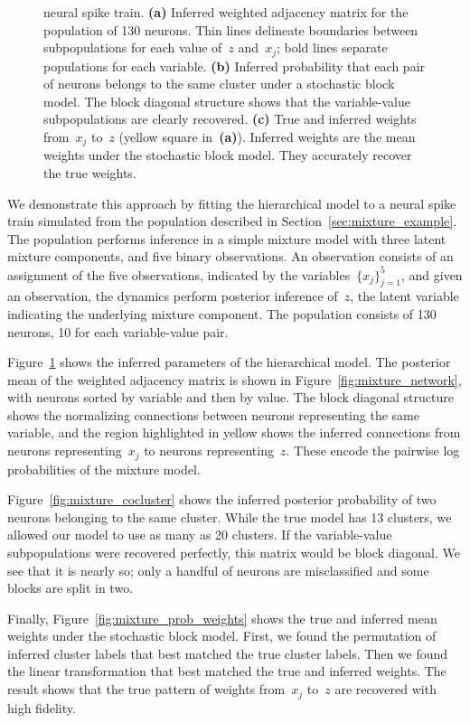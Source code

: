 \begin{figure}[t!]
{   neural spike train.
   \textbf{(a)} Inferred weighted adjacency matrix for the population
   of 130 neurons. Thin lines delineate boundaries between subpopulations
   for each value of~$z$ and~$x_j$; bold lines separate populations for
   each variable. 
   \textbf{(b)} Inferred probability that each pair of neurons belongs to
   the same cluster under a stochastic block model.
   The block diagonal structure shows that the
   variable-value subpopulations are clearly recovered.
   \textbf{(c)} True and inferred weights
   from~$x_j$ to~$z$ (yellow square in~\textbf{(a)}). Inferred weights
   are the mean weights under the stochastic block model. They accurately
   recover the true weights.
 }
 \label{fig:mixture_recovery}
\end{figure}

We demonstrate this approach by 
fitting the hierarchical model to a neural spike train simulated
from the population described in
Section~\ref{sec:mixture_example}. The population performs inference
in a simple mixture model with three latent mixture components,
and five binary observations. An observation consists of an assignment
of the five observations, indicated
by the variables~$\{x_j\}_{j=1}^5$, and given an observation, the dynamics
perform posterior inference of~$z$, the latent variable indicating the
underlying mixture component. The population consists of 130 neurons, 10 for
each variable-value pair.



Figure~\ref{fig:mixture_recovery} shows the inferred parameters of the
hierarchical model. The posterior mean of the weighted adjacency
matrix is shown in Figure~\ref{fig:mixture_network}, with neurons sorted
by variable and then by value. The block diagonal structure shows
the normalizing connections between neurons representing the same variable,
and the region highlighted in yellow shows the inferred connections from
neurons representing~$x_j$ to neurons representing~$z$. These encode
the pairwise log probabilities of the mixture model.

Figure~\ref{fig:mixture_cocluster} shows the inferred posterior probability
of two neurons belonging to the same cluster. While the true model has
13 clusters, we allowed our model to use as many as 20 clusters.
If the variable-value subpopulations
were recovered perfectly, this matrix would be block diagonal. We
see that it is nearly so; only a handful of neurons are misclassified
and some blocks are split in two.

Finally, Figure~\ref{fig:mixture_prob_weights} shows the true and inferred
mean weights under the stochastic block model. First, we found the permutation
of inferred cluster labels that best matched the true cluster labels. Then we found the
linear transformation that best matched the true and inferred weights.
The result shows that the true pattern of weights from~$x_j$ to~$z$ are
recovered with high fidelity.

